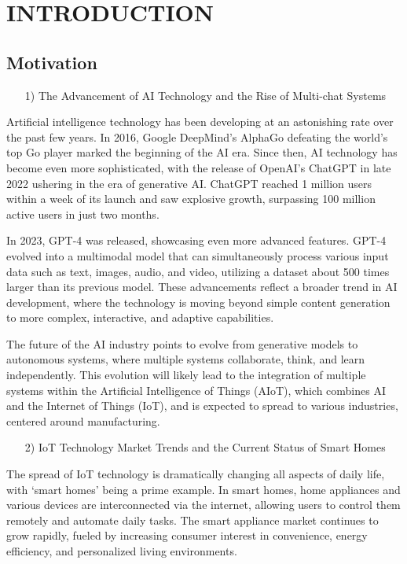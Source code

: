 \documentclass[conference]{IEEEtran}
\begin{document}
\section{INTRODUCTION}

\subsection{Motivation}

\begin{itemize}
    \item [1)] The Advancement of AI Technology and the Rise of Multi-chat Systems 
\end{itemize}
     \hspace{0.5em} Artificial intelligence technology has been developing at an astonishing rate over the past few years. In 2016, Google DeepMind's AlphaGo defeating the world's top Go player marked the beginning of the AI era. Since then, AI technology has become even more sophisticated, with the release of OpenAI's ChatGPT in late 2022 ushering in the era of generative AI. ChatGPT reached 1 million users within a week of its launch and saw explosive growth, surpassing 100 million active users in just two months.

    \hspace{0.5em} In 2023, GPT-4 was released, showcasing even more advanced features. GPT-4 evolved into a multimodal model that can simultaneously process various input data such as text, images, audio, and video, utilizing a dataset about 500 times larger than its previous model. These advancements reflect a broader trend in AI development, where the technology is moving beyond simple content generation to more complex, interactive, and adaptive capabilities.
    
    \hspace{0.5em} The future of the AI industry points to evolve from generative models to autonomous systems, where multiple systems collaborate, think, and learn independently. This evolution will likely lead to the integration of multiple systems within the Artificial Intelligence of Things (AIoT), which combines AI and the Internet of Things (IoT), and is expected to spread to various industries, centered around manufacturing. \\
\begin{itemize}
    \item [2)] IoT Technology Market Trends and the Current Status of Smart Homes
\end{itemize}
    \hspace{0.5em} The spread of IoT technology is dramatically changing all aspects of daily life, with `smart homes' being a prime example. In smart homes, home appliances and various devices are interconnected via the internet, allowing users to control them remotely and automate daily tasks.  The smart appliance market continues to grow rapidly, fueled by increasing consumer interest in convenience, energy efficiency, and personalized living environments. 
\end{document}
